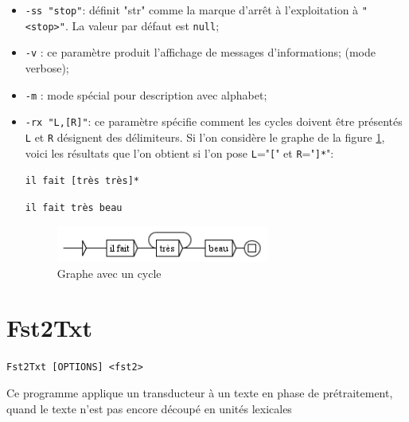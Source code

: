 \begin{itemize}
\item \verb$-ss "stop"$: définit "str" comme la marque d'arrêt à l'exploitation à \verb$"<stop>"$.
	La valeur par défaut est \verb$null$;

  \item \verb$-v$ : ce paramètre produit l’affichage de messages d’informations; (mode verbose);
  
  \item \verb$-m$ : mode spécial pour description avec alphabet;
  	  
  \item \verb$-rx "L,[R]"$: ce paramètre spécifie comment les cycles doivent être présentés \verb$L$ et \verb$R$ désignent des délimiteurs. Si l’on considère le graphe de la figure \ref{cycle},
  	  voici les résultats que l’on obtient si l’on pose \verb$L$="\verb$[$" et \verb$R$="\verb$]*$":

  \medskip
  \noindent
  \texttt{il fait [tr\`es tr\`es]*}
  
  \noindent
  \texttt{il fait tr\`es beau}

\begin{figure}[h]
\begin{center}
\includegraphics[width=7cm]{resources/img/fig10-1.png}
\caption{Graphe avec un cycle\label{cycle}}
\end{center}
\end{figure}

\end{itemize}







\section{Fst2Txt}
\verb+Fst2Txt [OPTIONS] <fst2>+

\bigskip
\noindent Ce programme applique un transducteur à un texte en phase de prétraitement, quand le
texte n’est pas encore découpé en unités lexicales


